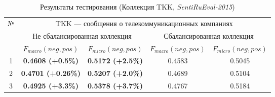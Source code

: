 \begin{table}[ht!]
\centering
\caption{Результаты тестирования (Коллекция TKK, {\it SentiRuEval-2015})}
\label{table:tkkResult2015}
\begin{tabular}{|c|c|c|c|c|}
\hline
\multirow{3}{*}{№} & \multicolumn{4}{c|}{TKK --- сообщения о телекоммуникационных компаниях}                                    \\ \cline{2-5}
                   & \multicolumn{2}{c|}{Не сбалансированная коллекция} & \multicolumn{2}{c|}{Сбалансированная коллекция} \\ \cline{2-5}
                   & $F_{macro}(neg, pos)$    & $F_{micro}(neg, pos)$   & $F_{macro}(neg, pos)$  & $F_{micro}(neg, pos)$  \\ \hline
1                  & {\bf 0.4608 (+0.5\%)}          & {\bf 0.5172 (+2.5\%)}          & 0.4583                 & 0.5045                 \\ \hline
2                  & {\bf 0.4701 (+0.26\%)}         & {\bf 0.5207 (+2.0\%)}          & 0.4689                 & 0.5104                 \\ \hline
3                  & {\bf 0.4925 (+3.3\%) }         & {\bf 0.5378 (+3.7\%)}          & 0.4767                 & 0.5184                 \\ \hline
\end{tabular}
\end{table}

